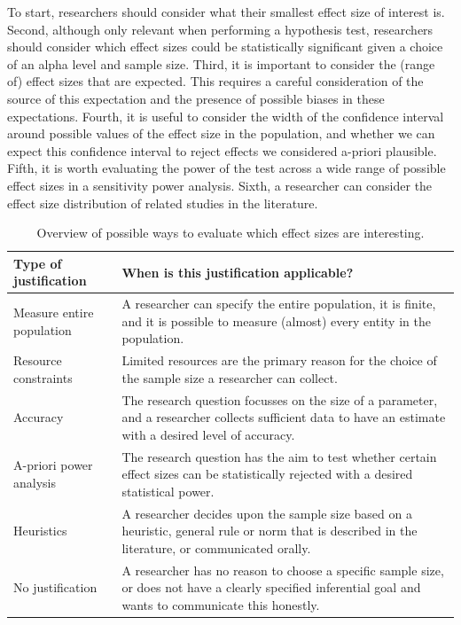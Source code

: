 \documentclass[
]{krantz}
\begin{document}
To start, researchers should consider what their smallest effect size of interest is. Second, although only relevant when performing a hypothesis test, researchers should consider which effect sizes could be statistically significant given a choice of an alpha level and sample size. Third, it is important to consider the (range of) effect sizes that are expected. This requires a careful consideration of the source of this expectation and the presence of possible biases in these expectations. Fourth, it is useful to consider the width of the confidence interval around possible values of the effect size in the population, and whether we can expect this confidence interval to reject effects we considered a-priori plausible. Fifth, it is worth evaluating the power of the test across a wide range of possible effect sizes in a sensitivity power analysis. Sixth, a researcher can consider the effect size distribution of related studies in the literature.

\begin{table}

\caption{\label{tab:table-effect-eval}Overview of possible ways to evaluate which effect sizes are interesting.}
\centering
\begin{tabular}[t]{l|l}
\hline
Type of justification & When is this justification applicable?\\
\hline
Measure entire population & A researcher can specify the entire population, it is finite, and it is possible to measure (almost) every entity in the population.\\
\hline
Resource constraints & Limited resources are the primary reason for the choice of the sample size a researcher can collect.\\
\hline
Accuracy & The research question focusses on the size of a parameter, and a researcher collects sufficient data to have an estimate with a desired level of accuracy.\\
\hline
A-priori power analysis & The research question has the aim to test whether certain effect sizes can be statistically rejected with a desired statistical power.\\
\hline
Heuristics & A researcher decides upon the sample size based on a heuristic, general rule or norm that is described in the literature, or communicated orally.\\
\hline
No justification & A researcher has no reason to choose a specific sample size, or does not have a clearly specified inferential goal and wants to communicate this honestly.\\
\hline
\end{tabular}
\end{table}
\end{document}
